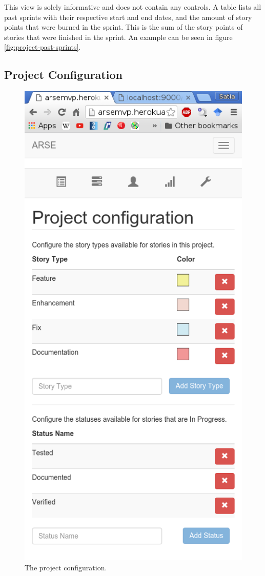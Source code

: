 \documentclass[
	accentcolor=tud1a %
]{tudreport}
\begin{document}

This view is solely informative and does not contain any controls. A table lists all past sprints with their respective start and end dates, and the amount of story points that were burned in the sprint. This is the sum of the story points of stories that were finished in the sprint. An example can be seen in figure \ref{fig:project-past-sprints}.

\subsection{Project Configuration}
\label{sec:proj-config}


\begin{figure}
	\centering
	\includegraphics[height=30EM]{img/configuration}
	\caption{The project configuration.}
	\label{fig:project-config}
\end{figure}
\end{document}
